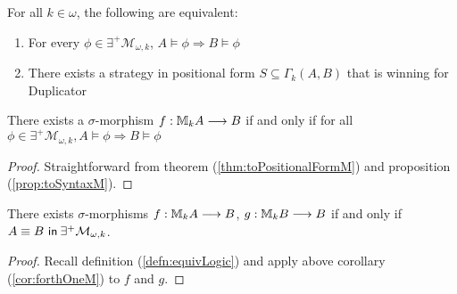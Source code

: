 \begin{prop}
For all $k \in \omega$, the following are equivalent:
\begin{enumerate}[label=(\arabic*)$_{k}$]
\item For every $\phi \in \exists^{+}\mathcal{M}_{\omega,k}$, $A \vDash \phi \Rightarrow B \vDash \phi$
\item There exists a strategy in positional form $S \subseteq \Gamma_{k}(A,B)$ that is winning for Duplicator 
\end{enumerate}
\begin{cor}
There exists a $\sigma$-morphism $f:{\mathbb{M}_{k}A} \longrightarrow B$ if and only if for all $\phi \in \exists^{+}\mathcal{M}_{\omega,k}, A \vDash \phi \Rightarrow B \vDash \phi$
\begin{proof}
Straightforward from theorem (\ref{thm:toPositionalFormM}) and proposition (\ref{prop:toSyntaxM}).
\end{proof}
\label{cor:forthOneM}
\end{cor}
\begin{cor}
There exists $\sigma$-morphisms $f:{\mathbb{M}_{k}A} \longrightarrow B$, $g:{\mathbb{M}_{k}B} \longrightarrow B$ if and only if ${A \equiv B \ \mathsf{in}\: \exists^{+}\mathcal{M}_{\omega,k}}$. 
\begin{proof}
Recall definition (\ref{defn:equivLogic}) and apply above corollary (\ref{cor:forthOneM}) to $f$ and $g$.  
\end{proof}
\label{cor:forthM}
\end{cor}
\label{prop:toSyntaxM}
\end{prop}

